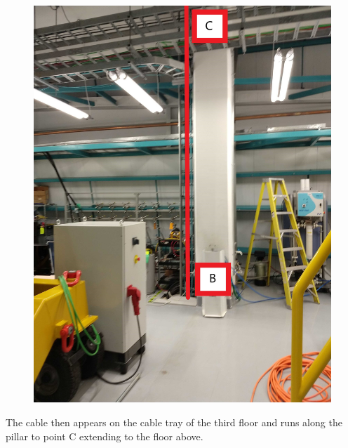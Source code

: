 \begin{figure}
  \includegraphics[width=\textwidth]{images/13.jpg}
  \label{fig:jlsimon}
\end{figure}

The cable then appears on the cable tray of the third floor and runs along the pillar to point C extending to the floor above.


